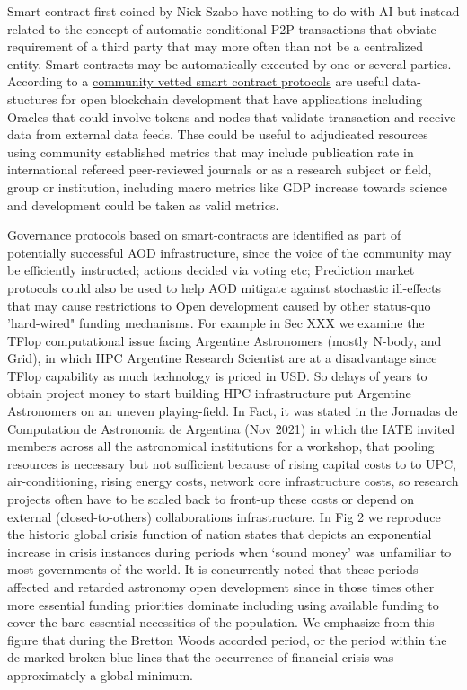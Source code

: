 \documentclass[final,5p,times,twocolumn,authoryear]{elsarticle}
\begin{document}
Smart contract first coined by Nick Szabo have nothing to do with AI but instead related to the concept of automatic conditional P2P transactions that obviate requirement of a third party that may more often than not be a centralized entity. Smart contracts may be  automatically executed by one or several parties. According to a \href{https://www.fon.hum.uva.nl/rob/Courses/InformationInSpeech/CDROM/Literature/LOTwinterschool2006/szabo.best.vwh.net/smart_contracts_2.html}{community vetted smart contract protocols} are useful data-stuctures for open blockchain development that have applications including Oracles that could involve tokens and nodes that validate transaction and receive data from external data feeds. Thse could be useful to adjudicated resources using community established metrics that may include publication rate in international refereed peer-reviewed journals or as  a research subject or field, group or institution, including macro metrics like GDP increase towards science and development could be taken as  valid metrics. 

Governance protocols based on smart-contracts are identified as part of potentially successful AOD infrastructure, since the voice of the community may be efficiently instructed;  actions decided via voting etc; Prediction market protocols could also be used to help AOD mitigate against stochastic ill-effects that may cause restrictions to Open development caused by other status-quo 'hard-wired" funding mechanisms. For example in Sec XXX we examine the TFlop computational issue facing Argentine Astronomers (mostly N-body, and Grid), in which HPC Argentine Research Scientist are at a disadvantage since TFlop capability as much technology is priced in USD. So delays of years to obtain project money to start building HPC infrastructure put Argentine Astronomers on an uneven playing-field. In Fact, it was stated in the Jornadas de Computation de Astronomia de Argentina (Nov 2021)  in which the IATE invited members across all the astronomical institutions for a workshop, that pooling resources is necessary but not sufficient because of rising capital costs to to UPC, air-conditioning, rising energy costs, network core infrastructure costs, so research projects often have to be scaled back to front-up these costs or depend on external (closed-to-others) collaborations infrastructure. In Fig 2 we reproduce the historic global crisis function of nation states that depicts an exponential increase in crisis instances during periods when `sound money' was  unfamiliar to most governments of the world. It is concurrently noted that these periods affected and retarded astronomy open development since in those times other more essential funding priorities dominate including using available funding to cover the bare essential necessities of the population. We emphasize from this figure that during the Bretton Woods accorded period, or the period within the de-marked broken blue lines that the occurrence of financial crisis was approximately a global minimum. 
\end{document}
